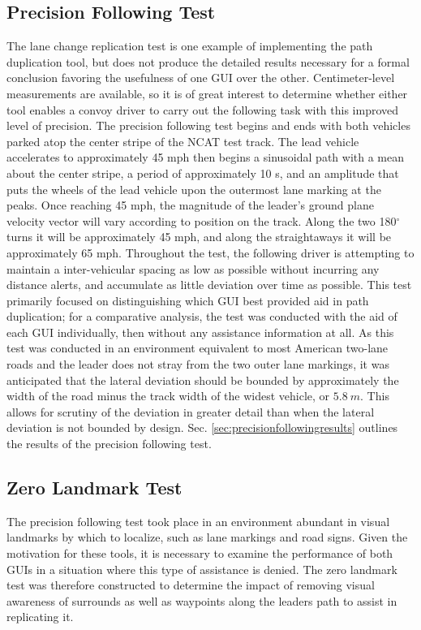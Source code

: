 \subsection{Precision Following Test} \label{sec:targetspacingtest}
The lane change replication test is one example of implementing the path duplication tool, but does not produce the detailed results necessary for a formal conclusion favoring the usefulness of one GUI over the other. Centimeter-level measurements are available, so it is of great interest to determine whether either tool enables a convoy driver to carry out the following task with this improved level of precision. The precision following test begins and ends with both vehicles parked atop the center stripe of the NCAT test track. The lead vehicle accelerates to approximately 45 mph then begins a sinusoidal path with a mean about the center stripe, a period of approximately 10 s, and an amplitude that puts the wheels of the lead vehicle upon the outermost lane marking at the peaks. Once reaching 45 mph, the magnitude of the leader's ground plane velocity vector will vary according to position on the track. Along the two 180$^\circ$ turns it will be approximately 45 mph, and along the straightaways it will be approximately 65 mph. Throughout the test, the following driver is attempting to maintain a inter-vehicular spacing as low as possible without incurring any distance alerts, and accumulate as little deviation over time as possible. 
This test primarily focused on distinguishing which GUI best provided aid in path duplication; for a comparative analysis, the test was conducted with the aid of each GUI individually, then without any assistance information at all. As this test was conducted in an environment equivalent to most American two-lane roads and the leader does not stray from the two outer lane markings, it was anticipated that the lateral deviation should be bounded by approximately the width of the road minus the track width of the widest vehicle, or $5.8~m$. This allows for scrutiny of the deviation in greater detail than when the lateral deviation is not bounded by design. Sec. \ref{sec:precisionfollowingresults} outlines the results of the precision following test.

\subsection{Zero Landmark Test} \label{sec:zerolandmarktest}
The precision following test took place in an environment abundant in visual landmarks by which to localize, such as lane markings and road signs. Given the motivation for these tools, it is necessary to examine the performance of both GUIs in a situation where this type of assistance is denied. The zero landmark test was therefore constructed to determine the impact of removing visual awareness of surrounds as well as waypoints along the leaders path to assist in replicating it.

